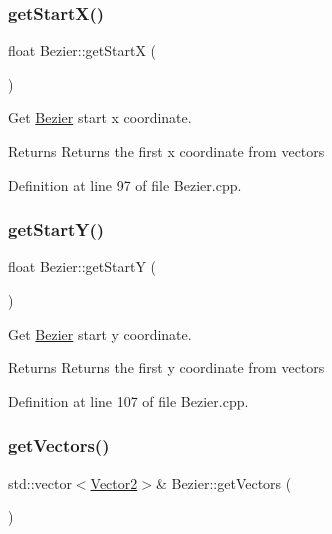 \subsubsection{\texorpdfstring{get\+Start\+X()}{getStartX()}}
{\footnotesize\ttfamily float Bezier\+::get\+StartX (\begin{DoxyParamCaption}{ }\end{DoxyParamCaption})}



Get \mbox{\hyperlink{classBezier}{Bezier}} start x coordinate. 

\begin{DoxyReturn}{Returns}
Returns the first x coordinate from vectors 
\end{DoxyReturn}


Definition at line 97 of file Bezier.\+cpp.

\mbox{\label{classBezier_ae310b53e4d8b3d586bbc4d335ac4cc08}} 
\subsubsection{\texorpdfstring{get\+Start\+Y()}{getStartY()}}
{\footnotesize\ttfamily float Bezier\+::get\+StartY (\begin{DoxyParamCaption}{ }\end{DoxyParamCaption})}



Get \mbox{\hyperlink{classBezier}{Bezier}} start y coordinate. 

\begin{DoxyReturn}{Returns}
Returns the first y coordinate from vectors 
\end{DoxyReturn}


Definition at line 107 of file Bezier.\+cpp.

\mbox{\label{classBezier_a26bf332b0c831e0f302f1d72ec782436}} 
\subsubsection{\texorpdfstring{get\+Vectors()}{getVectors()}\hspace{0.1cm}{\footnotesize\ttfamily [1/2]}}
{\footnotesize\ttfamily std\+::vector$<$\mbox{\hyperlink{classVector2}{Vector2}}$>$\& Bezier\+::get\+Vectors (\begin{DoxyParamCaption}{ }\end{DoxyParamCaption})\hspace{0.3cm}{\ttfamily [inline]}}



